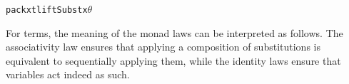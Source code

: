\documentclass[9pt,preprint,authoryear]{sigplanconf}
\begin{document}
{{{}\vphantom{$\{$}}}\textcolor[rgb]{0,0,0.80}{\texttt{\mbox{\hspace{0.50em}}}}\textcolor[rgb]{0,0,0.80}{\texttt{\mbox{\hspace{0.50em}}}}\textcolor[rgb]{0,0,0.80}{\texttt{\mbox{\hspace{0.50em}}}}\textcolor[rgb]{0,0,0.80}{\texttt{\mbox{\hspace{0.50em}}}}\textcolor[rgb]{0,0,0.80}{\texttt{\mbox{\hspace{0.50em}}}}\textcolor[rgb]{0,0,0.80}{\texttt{\mbox{\hspace{0.50em}}}}\textcolor[rgb]{0,0,0.80}{\texttt{\mbox{\hspace{0.50em}}}}\textcolor[rgb]{0,0,0.80}{\texttt{\mbox{\hspace{0.50em}}}}\textcolor[rgb]{0,0,0.80}{\texttt{\mbox{\hspace{0.50em}}}}\textcolor[rgb]{0,0,0.80}{\texttt{\mbox{\hspace{0.50em}}}}\textcolor[rgb]{0,0,0.80}{\texttt{\mbox{\hspace{0.50em}}}}\textcolor[rgb]{0,0,0.80}{\texttt{\mbox{\hspace{0.50em}}}}\textcolor[rgb]{0,0,0.80}{\texttt{\mbox{\hspace{0.50em}}}}\textcolor[rgb]{0,0,0.80}{\texttt{pack}}\textcolor[rgb]{0,0,0.80}{\texttt{\mbox{\hspace{0.50em}}}}\textcolor[rgb]{0,0,0.80}{\texttt{x}}\textcolor[rgb]{0,0,0.80}{\texttt{\mbox{\hspace{0.50em}}}}\textcolor[cmyk]{0,0.65,0.99,0}{\texttt{\makebox[1.22ex][l]{$ {(} $}}}\textcolor[rgb]{0,0,0.80}{\texttt{t}}\textcolor[rgb]{0,0,0.80}{\texttt{\mbox{\hspace{0.50em}}}}\textcolor[rgb]{0,0,0.80}{\texttt{\makebox[1.22ex][c]{\textgreater{}}}}\textcolor[rgb]{0,0,0.80}{\texttt{\mbox{\hspace{0.50em}}}}\textcolor[rgb]{0,0,0.80}{\texttt{liftSubst}}\textcolor[rgb]{0,0,0.80}{\texttt{\mbox{\hspace{0.50em}}}}\textcolor[rgb]{0,0,0.80}{\texttt{x}}\textcolor[rgb]{0,0,0.80}{\texttt{\mbox{\hspace{0.50em}}}}\textcolor[rgb]{0,0,0.80}{\texttt{$ \theta $}}\textcolor[cmyk]{0,0.65,0.99,0}{\texttt{\makebox[1.22ex][r]{$ {)} $}}}\textcolor[rgb]{0,0,0.80}{\texttt{{\nopagebreak \newline%
}\vphantom{$\{$}}}%


%
For terms, the meaning of the monad laws can be interpreted as follows.
    The associativity law ensures that applying a composition of
    substitutions is equivalent to sequentially applying them, while the
    identity laws ensure that variables act indeed as such.%
\end{document}
